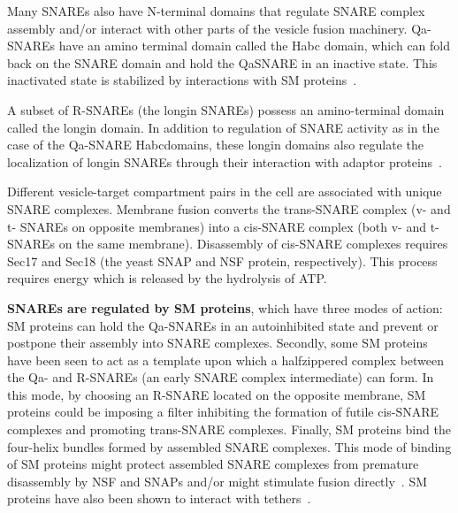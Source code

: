 	


Many SNAREs also have N-terminal domains that regulate SNARE complex assembly and/or
interact with other parts of the vesicle fusion machinery. 
%
Qa-SNAREs have an amino terminal
domain called the Habc domain, which can fold back on the SNARE domain and hold the QaSNARE
in an inactive state. 
%
This inactivated state is stabilized by interactions with SM proteins~\cite{yoon2018snare}.	      

A subset of R-SNAREs (the longin SNAREs) possess an amino-terminal domain called the longin domain. 
%
In addition to regulation of SNARE activity as in the case of the Qa-SNARE Habcdomains,
these longin domains also regulate the localization of longin SNAREs through their
interaction with adaptor proteins~\cite{daste2015structure}.

Different vesicle-target compartment pairs in the cell are associated with unique SNARE
complexes.
%
Membrane fusion converts the trans-SNARE complex (v- and t- SNAREs on opposite
membranes) into a cis-SNARE complex (both v- and t- SNAREs on the same membrane).
Disassembly of cis-SNARE complexes requires Sec17 and Sec18 (the yeast SNAP and NSF
protein, respectively). 
%
This process requires energy which is released by the hydrolysis of ATP.

\textbf{SNAREs are regulated by SM proteins}, which have three modes of action: SM proteins can hold
the Qa-SNAREs in an autoinhibited state and prevent or postpone their assembly into SNARE
complexes.
%
Secondly, some SM proteins have been seen to act as a template upon which a halfzippered
complex between the Qa- and R-SNAREs (an early SNARE complex intermediate) can
form. 
%
In this mode, by choosing an R-SNARE located on the opposite membrane, SM proteins
could be imposing a filter inhibiting the formation of futile cis-SNARE complexes and promoting
trans-SNARE complexes.
%
Finally, SM proteins bind the four-helix bundles formed by assembled
SNARE complexes.
%
This mode of binding of SM proteins might protect assembled SNARE
complexes from premature disassembly by NSF and SNAPs and/or might stimulate fusion directly~\cite{baker2016chaperoning}.
%
SM proteins have also been shown to interact with tethers~\cite{yoon2018snare}.

